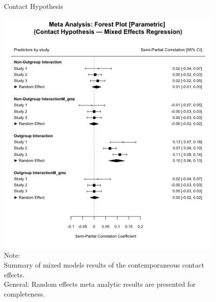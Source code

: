\documentclass[man, 12pt, a4paper, mask]{apa7}
\theoremstyle{break}
\theoremstyle{plain}
\begin{document}
\begin{figure}
  \caption{Contact Hypothesis}
  \label{fig:ContactHypothesis}
  \centering\includegraphics[width=\textwidth]{Figures/forestParametricREMLGeneralLmer.png}
  \caption*{Note: \\
  Summary of mixed models results of the contemporaneous contact effects.\\
  General: Random effects meta analytic results are presented for completeness.}
\end{figure}
\end{document}
